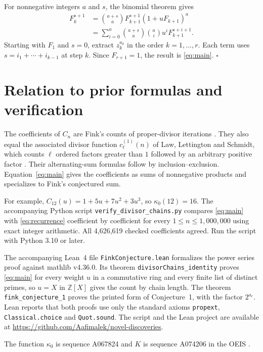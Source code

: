 \documentclass[11pt,letterpaper]{article}
\begin{document}
For nonnegative integers $a$ and $s$, the binomial theorem gives
\begin{align*}
[z_k^a]F_k^{s+1}
&=\binom{a+s}{a}F_{k+1}^{s+1}(1+uF_{k+1})^a\\
&=\sum_{i=0}^a \binom{a+s}{a}\binom{a}{i}u^iF_{k+1}^{s+i+1}.
\end{align*}
Starting with $F_1$ and $s=0$, extract $z_k^{a_k}$ in the order
$k=1,\ldots,r$. Each term uses $s=i_1+\cdots+i_{k-1}$ at step $k$.
Since $F_{r+1}=1$, the result is \eqref{eq:main}. \hfill$\square$

\section{Relation to prior formulas and verification}

The coefficients of $C_n$ are Fink's counts of proper-divisor iterations
\cite[\S\,4]{fink}. They also equal the associated divisor function
$c_\ell^{(1)}(n)$ of Law, Lettington and Schmidt, which counts $\ell$
ordered factors greater than $1$ followed by an arbitrary positive factor
\cite[Eq.\,(2)]{law}. Their alternating-sum formulas follow by
inclusion--exclusion. Equation~\eqref{eq:main} gives the coefficients as
sums of nonnegative products and specializes to Fink's conjectured sum.

For example, $C_{12}(u)=1+5u+7u^2+3u^3$, so $\kappa_0(12)=16$.
The accompanying Python script \texttt{verify\_divisor\_chains.py}
compares \eqref{eq:main} with \eqref{eq:recurrence} coefficient by
coefficient for every $1\le n\le 1{,}000{,}000$ using exact integer
arithmetic. All 4,626,619 checked coefficients agreed. Run the script
with Python 3.10 or later.

The accompanying Lean~4 file \texttt{FinkConjecture.lean} formalizes the
power series proof against mathlib v4.36.0. Its theorem
\texttt{divisorChains\_identity} proves \eqref{eq:main} for every weight
$u$ in a commutative ring and every finite list of distinct primes, so
$u=X$ in $\mathbb Z[X]$ gives the count by chain length. The theorem
\texttt{fink\_conjecture\_1} proves the printed form of Conjecture~1, with
the factor $2^{a_r}$. Lean reports that both proofs use only the standard
axioms \texttt{propext}, \texttt{Classical.choice} and \texttt{Quot.sound}.
The script and the Lean project are available at
\url{https://github.com/Aafimalek/novel-discoveries}.

The function $\kappa_0$ is sequence A067824 and $K$ is sequence A074206 in
the OEIS \cite{oeis}.
\end{document}
